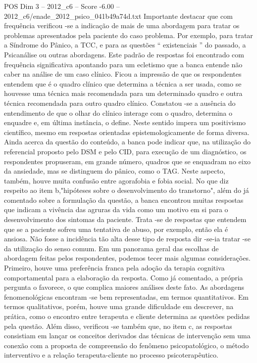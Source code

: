 \begin{textsample}{POS Dim 3 – 2012\_c6 – Score -6.00 – 2012\_c6/enade\_2012\_psico\_041b49a74d.txt}
Importante destacar que com frequência verificou -se a indicação de mais de uma abordagem para tratar os problemas apresentados pela paciente do caso problema.
Por exemplo, para tratar a Síndrome do Pânico, a TCC, e para as questões “ existenciais ” do passado, a Psicanálise ou outras abordagens.
Este padrão de respostas foi encontrado com frequência significativa apontando para um ecletismo que a banca entende não caber na análise de um caso clínico.
Ficou a impressão de que os respondentes entendem que é o quadro clínico que determina a técnica a ser usada, como se houvesse uma técnica mais recomendada para um determinado quadro e outra técnica recomendada para outro quadro clínico.
Constatou -se a ausência do entendimento de que o olhar do clínico interage com o quadro, determina o enquadre e, em última instância, o define.
Neste sentido impera um positivismo científico, mesmo em respostas orientadas epistemologicamente de forma diversa.
Ainda acerca da questão do conteúdo, a banca pode indicar que, na utilização do referencial proposto pelo DSM e pelo CID, para execução de um diagnóstico, os respondentes propuseram, em grande número, quadros que se enquadram no eixo da ansiedade, mas se distinguem do pânico, como o TAG.
Neste aspecto, também, houve muita confusão entre agorafobia e fobia social.
No que diz respeito ao item b,"hipóteses sobre o desenvolvimento do transtorno", além do já comentado sobre a formulação da questão, a banca encontrou muitas respostas que indicam a vivência das agruras da vida como um motivo em si para o desenvolvimento dos sintomas da paciente.
Trata -se de respostas que entendem que se a paciente sofreu uma tentativa de abuso, por exemplo, então ela é ansiosa.
Não fosse a incidência tão alta desse tipo de resposta dir -se-ia tratar -se da utilização do senso comum.
Em um panorama geral das escolhas de abordagem feitas pelos respondentes, podemos tecer mais algumas considerações.
Primeiro, houve uma preferência franca pela adoção da terapia cognitiva comportamental para a elaboração da resposta.
Como já comentado, a própria pergunta o favorece, o que complica maiores análises deste fato.
As abordagens fenomenológicas encontram -se bem representadas, em termos quantitativos.
Em termos qualitativos, porém, houve uma grande dificuldade em descrever, na prática, como o encontro entre terapeuta e cliente determina as questões pedidas pela questão.
Além disso, verificou -se também que, no item c, as respostas consistiam em lançar os conceitos derivados das técnicas de intervenção sem uma conexão com a proposta de compreensão do fenômeno psicopatológico, o método interventivo e a relação terapeuta-cliente no processo psicoterapêutico.

\end{textsample}
